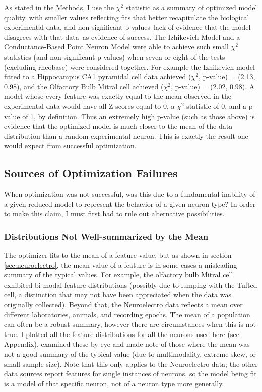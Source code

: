 As stated in the Methods, I use the $\chi^2$ statistic as a summary of optimized model quality, with smaller values reflecting fits that better recapitulate the biological experimental data, and non-significant p-values--lack of evidence that the model disagrees with that data--as evidence of success.
The Izhikevich Model and a Conductance-Based Point Neuron Model were able to achieve such small $\chi^2$ statistics (and non-significant p-values) when seven or eight of the tests (excluding rheobase) were considered together.
For example the Izhikevich model fitted to a Hippocampus CA1 pyramidal cell data achieved ($\chi^2$, p-value) = (2.13, 0.98), and the Olfactory Bulb Mitral cell achieved ($\chi^2$, p-value) = (2.02, 0.98).
A model whose every feature was exactly equal to the mean observed in the experimental data would have all Z-scores equal to 0, a $\chi^2$ statistic of 0, and a p-value of 1, by definition.
Thus an extremely high p-value (such as those above) is evidence that the optimized model is much closer to the mean of the data distribution than a random experimental neuron.
This is exactly the result one would expect from successful optimization.

\subsection{Sources of Optimization Failures}
When optimization was not successful, was this due to a fundamental inability of a given reduced model to represent the behavior of a given neuron type?
In order to make this claim, I must first had to rule out alternative possibilities.

\subsubsection{Distributions Not Well-summarized by the Mean}
The optimizer fits to the mean of a feature value, but as shown in section \ref{sec:neuroelectro}, the mean value of a feature is in some cases a misleading summary of the typical values.
For example, the olfactory bulb Mitral cell exhibited bi-modal feature distributions (possibly due to lumping with the Tufted cell, a distinction that may not have been appreciated when the data was originally collected).
Beyond that, the Neuroelectro data reflects a mean over different laboratories, animals, and recording epochs. The mean of a population can often be a robust summary, however there are circumstances when this is not true.
I plotted all the feature distributions for all the neurons used here (see Appendix), examined these by eye and made note of those where the mean was not a good summary of the typical value (due to multimodality, extreme skew, or small sample size).
Note that this only applies to the Neuroelectro data; the other data sources report features for single instances of neurons, so the model being fit is a model of that specific neuron, not of a neuron type more generally.

